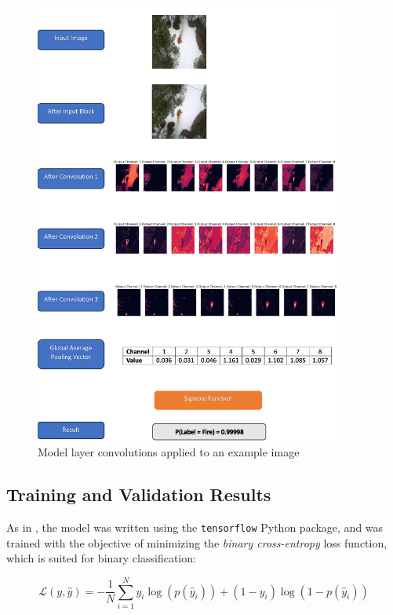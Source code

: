 \documentclass[a4paper,11pt]{article} %
\begin{document}
\begin{figure}
    \centering
    \includegraphics[width=0.9\textwidth]{../figures/model_layers_example/model_layers.png}
    \caption{Model layer convolutions applied to an example image}
\end{figure}


\subsection{Training and Validation Results}
As in \cite{FLAME_dataset}, the model was written using the \verb!tensorflow! Python package, and
was trained with the objective of minimizing the \emph{binary cross-entropy} loss function, which is
suited for binary classification:

\[
    \mathcal{L}(y,\hat{y}) = -\frac{1}{N} \sum_{i=1}^{N} y_i \log (p(\hat{y}_i)) + (1 - y_i) \log (1- p(\hat{y}_i))    
\]
\end{document}
